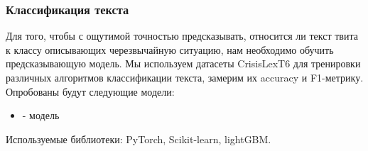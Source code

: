 \subsubsection{Классификация текста}
Для того, чтобы с ощутимой точностью предсказывать, относится ли текст твита к классу описывающих черезвычайную ситуацию, нам необходимо обучить предсказывающую модель. Мы используем датасеты CrisisLexT6 для тренировки различных алгоритмов классификации текста, замерим их accuracy и F1-метрику. Опробованы будут следующие модели:
\begin{itemize}
\item - модель
\end{itemize}
Используемые библиотеки: PyTorch, Scikit-learn, lightGBM.

\pagebreak
